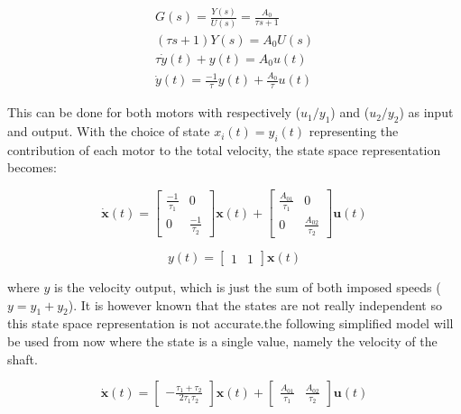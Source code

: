 \begin{gather}
    G(s) = \frac{Y(s)}{U(s)} = \frac{A_0}{\tau s + 1}\\
    \left(\tau s + 1\right) Y(s) = A_0 U(s)\\
    \tau \dot{y}(t) + y(t) = A_0 u(t)\\
    \dot{y}(t) = \frac{-1}{\tau} y(t) + \frac{A_0}{\tau} u(t)
\end{gather}

This can be done for both motors with respectively ($u_1/y_1$) and ($u_2/y_2$) as input and output. With the choice of 
state $x_i(t) = y_i(t)$ representing the contribution of each motor to the total velocity, the state space 
representation becomes:

\begin{equation*}
    \dot{\mathbf{x}}(t) = \begin{bmatrix}
    \frac{-1}{\tau_1} & 0 \\ 
    0 & \frac{-1}{\tau_2}
    \end{bmatrix} \mathbf{x}(t) + \begin{bmatrix} 
    \frac{A_{01}}{\tau_1} & 0\\ 
    0 & \frac{A_{02}}{\tau_2} 
    \end{bmatrix}\mathbf{u}(t)
\end{equation*}

\begin{equation}
    y(t) = \begin{bmatrix} 1 & 1 \end{bmatrix}\mathbf{x}(t)
\end{equation}

where \( y \) is the velocity output, which is just the sum of both imposed speeds ($y = y_1 + y_2$). It is however 
known that the states are not really independent so this state space representation is not accurate.the following 
simplified model will be used from now where the state is a single value, namely the velocity of the shaft.

\begin{equation}
    \dot{\mathbf{x}}(t) = \begin{bmatrix}-\frac{\tau_1+\tau_2}{2 \tau_1 \tau_2}\end{bmatrix} \mathbf{x}(t) + 
    \begin{bmatrix} 
     \frac{A_{01}}{\tau_1} & \frac{A_{02}}{\tau_2} 
    \end{bmatrix}\mathbf{u}(t)
    \label{eq:state_space_model_cx}
\end{equation}

